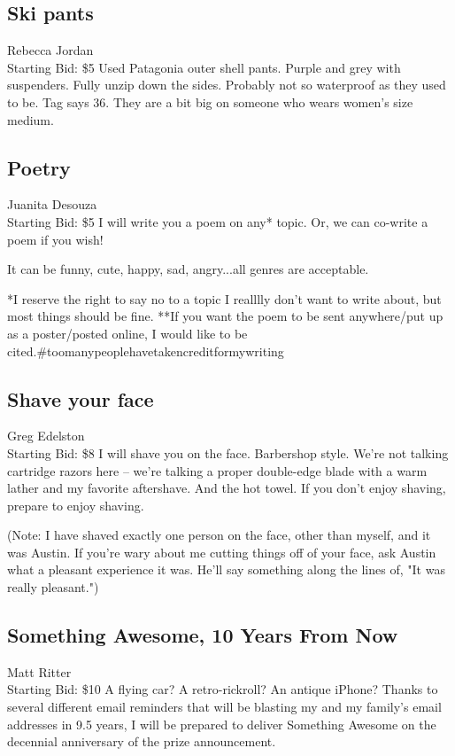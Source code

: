 \documentclass[11pt]{article}
\begin{document}
\subsection{Ski pants}
Rebecca Jordan
\\
Starting Bid: \$5
\newline
Used Patagonia outer shell pants. Purple and grey with suspenders. Fully unzip down the sides. Probably not so waterproof as they used to be. Tag says 36. They are a bit big on someone who wears women's size medium.
\subsection{Poetry}
Juanita Desouza
\\
Starting Bid: \$5
\newline
I will write you a poem on any* topic. Or, we can co-write a poem if you wish! 

It can be funny, cute, happy, sad, angry...all genres are acceptable.

*I reserve the right to say no to a topic I realllly don't want to write about, but most things should be fine.
**If you want the poem to be sent anywhere/put up as a poster/posted online, I would like to be cited.\#toomanypeoplehavetakencreditformywriting
\subsection{Shave your face}
Greg Edelston
\\
Starting Bid: \$8
\newline
I will shave you on the face. Barbershop style. We're not talking cartridge razors here -- we're talking a proper double-edge blade with a warm lather and my favorite aftershave. And the hot towel. If you don't enjoy shaving, prepare to enjoy shaving.

(Note: I have shaved exactly one person on the face, other than myself, and it was Austin. If you're wary about me cutting things off of your face, ask Austin what a pleasant experience it was. He'll say something along the lines of, "It was really pleasant.")
\subsection{Something Awesome, 10 Years From Now}
Matt Ritter
\\
Starting Bid: \$10
\newline
A flying car? A retro-rickroll? An antique iPhone?
Thanks to several different email reminders that will be blasting my and my family’s email addresses in 9.5 years, I will be prepared to deliver Something Awesome on the decennial anniversary of the prize announcement.
\end{document}
